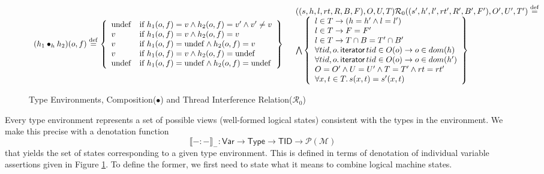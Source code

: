 \begin{figure}
$
\begin{array}{l}
(h_1\bullet_h h_2)(o,f)\overset{\mathrm{def}}{=}  \left\{
\begin{array}{ll}  
\mathrm{undef} & \textrm{if}~h_1(o,f)=v \land h_2(o,f)=v' \land v' \neq v\\
v & \textrm{if}~h_1(o,f)=v \land h_2(o,f)=v\\
v & \textrm{if}~h_1(o,f)=\mathrm{undef}\land h_2(o,f)=v\\
v & \textrm{if}~h_1(o,f)=v\land h_2(o,f)=\mathrm{undef}\\
\mathrm{undef} & \textrm{if}~h_1(o,f)=\mathrm{undef}\land h_2(o,f)=\mathrm{undef}
\end{array}
\right\}
\end{array}
\;\;
\begin{array}{l}
((s,h,l,rt,R,B,F), O, U, T) \mathcal{R}_{0}((s',h',l',rt',R',B',F'), O', U', T') \overset{\mathrm{def}}{=}
\\ \bigwedge\left\{
	\begin{array}{l}
	  l  \in  T \rightarrow (h = h' \land l=l')\\
	  l\in T\rightarrow F=F'\\
          l\in T\rightarrow T \cap B= T'\cap B'\\
	  \forall tid,o\ldotp\textsf{iterator} \, tid \in O(o) \rightarrow o \in dom(h) \\
	  \forall tid,o\ldotp\textsf{iterator} \, tid \in O(o) \rightarrow o \in dom(h') \\
	  O = O' \land U = U' \land T = T'\land rt = rt' \\

	  \forall x, t \in T \ldotp s(x,t) = s'(x,t)
	\end{array}
\right\}
\end{array}
$

\caption{Type Environments, Composition($\bullet$) and Thread Interference Relation($\mathcal{R}_{0}$)}
\label{fig:denotingtypeenviromentp}
\vspace{-2mm}
\end{figure}
Every type environment represents a set of possible views (well-formed logical states) consistent with the types in the environment.  We make this precise with a denotation function
\[\llbracket-:-\rrbracket_- : \mathsf{Var}\rightarrow\mathsf{Type}\rightarrow\mathsf{TID}\rightarrow\mathcal{P}(\mathcal{M})\] that yields the set of states corresponding to a given type environment. This is defined in terms of denotation of individual variable assertions given in Figure \ref{fig:denotingtypeenviromentp}. To define the former, we first need to state what it means to combine logical machine states.

